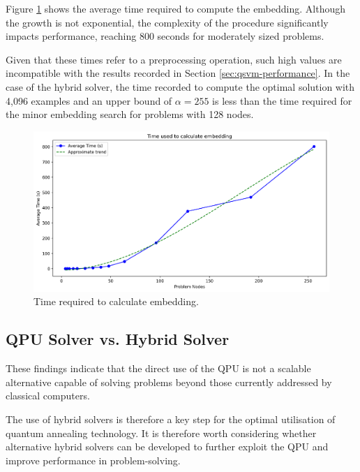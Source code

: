 Figure \ref{fig:scale_time} shows the average time required to compute the embedding. 
Although the growth is not exponential, the complexity of the procedure significantly impacts performance, reaching 800 seconds for moderately sized problems.

Given that these times refer to a preprocessing operation, such high values are incompatible with the results recorded in Section \ref{sec:qsvm-performance}. 
In the case of the hybrid solver, the time recorded to compute the optimal solution with 4,096 examples and an upper bound of $\alpha = 255$ is less than the time required for the minor embedding search for problems with 128 nodes.

\begin{figure}[H] 
	\centering 
	\includegraphics[width=\textwidth]{figures/scale_time.png} 	
	\caption{Time required to calculate embedding.} 
	\label{fig:scale_time}
\end{figure}

\subsection{QPU Solver vs. Hybrid Solver}

These findings indicate that the direct use of the QPU is not a scalable alternative capable of solving problems beyond those currently addressed by classical computers.

The use of hybrid solvers is therefore a key step for the optimal utilisation of quantum annealing technology. 
It is therefore worth considering whether alternative hybrid solvers can be developed to further exploit the QPU and improve performance in problem-solving.